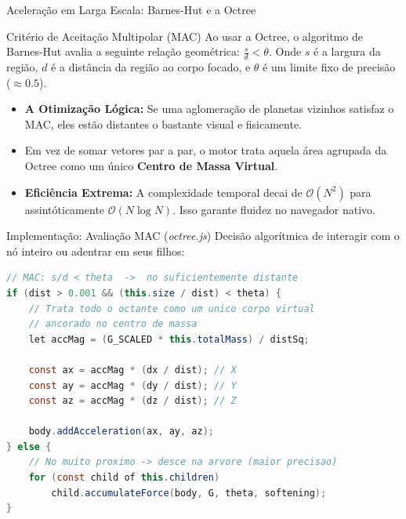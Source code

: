 \documentclass[10pt, aspectratio=169]{beamer}
\begin{document}
\begin{frame}{Aceleração em Larga Escala: Barnes-Hut e a Octree}
    \begin{block}{Critério de Aceitação Multipolar (MAC)}
        Ao usar a Octree, o algoritmo de Barnes-Hut avalia a seguinte relação geométrica: $\frac{s}{d} < \theta$.
        Onde $s$ é a largura da região, $d$ é a distância da região ao corpo focado, e $\theta$ é um limite fixo de precisão ($\approx 0.5$).
    \end{block}
    
    \vspace{0.3cm}
    
    \begin{itemize}
        \item \textbf{A Otimização Lógica:} Se uma aglomeração de planetas vizinhos satisfaz o MAC, eles estão distantes o bastante visual e fisicamente.
        \item Em vez de somar vetores par a par, o motor trata aquela área agrupada da Octree como um único \textbf{Centro de Massa Virtual}.
        \item \textbf{Eficiência Extrema:} A complexidade temporal decai de $\mathcal{O}(N^2)$ para assintóticamente $\mathcal{O}(N \log N)$. Isso garante fluidez no navegador nativo.
    \end{itemize}
\end{frame}

\begin{frame}[fragile]{Implementação: Avaliação MAC (\textit{octree.js})}
    Decisão algorítmica de interagir com o nó inteiro ou adentrar em seus filhos:
\begin{lstlisting}[language=Java]
// MAC: s/d < theta  ->  no suficientemente distante
if (dist > 0.001 && (this.size / dist) < theta) {
    // Trata todo o octante como um unico corpo virtual 
    // ancorado no centro de massa
    let accMag = (G_SCALED * this.totalMass) / distSq;
    
    const ax = accMag * (dx / dist); // X
    const ay = accMag * (dy / dist); // Y
    const az = accMag * (dz / dist); // Z
    
    body.addAcceleration(ax, ay, az);
} else {
    // No muito proximo -> desce na arvore (maior precisao)
    for (const child of this.children) 
        child.accumulateForce(body, G, theta, softening);
}
\end{lstlisting}
\end{frame}
\end{document}
